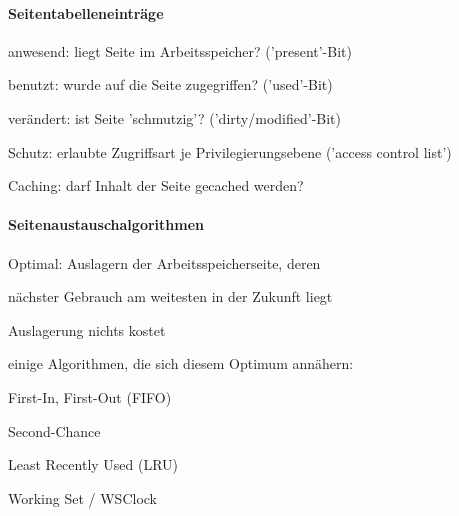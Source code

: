 \documentclass[a4paper]{article}
\begin{document}
\begin{multicols}{3}
  \paragraph{Seitentabelleneinträge}
  \begin{itemize*}
    \item anwesend: liegt Seite im Arbeitsspeicher? ('present'-Bit)
    \item benutzt: wurde auf die Seite zugegriffen? ('used'-Bit)
    \item verändert: ist Seite 'schmutzig'? ('dirty/modified'-Bit)
    \item Schutz: erlaubte Zugriffsart je Privilegierungsebene ('access control list')
    \item Caching: darf Inhalt der Seite gecached werden?
  \end{itemize*}

  \paragraph{Seitenaustauschalgorithmen}
  \begin{itemize*}
    \item Optimal: Auslagern der Arbeitsspeicherseite, deren
    \begin{itemize*}
      \item nächster Gebrauch am weitesten in der Zukunft liegt
      \item Auslagerung nichts kostet
    \end{itemize*}
    \item einige Algorithmen, die sich diesem Optimum annähern:
    \begin{itemize*}
      \item First-In, First-Out (FIFO)
      \item Second-Chance
      \item Least Recently Used (LRU)
      \item Working Set / WSClock
    \end{itemize*}
  \end{itemize*}


\end{multicols}
\end{document}
